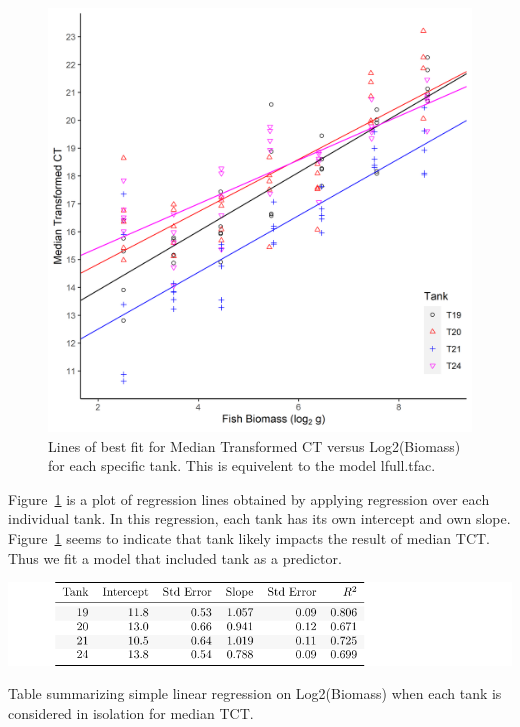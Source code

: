 \begin{figure}[H]
\includegraphics{Chapter3Images/ggplotnew2.png}
\caption{ Lines of best fit for Median Transformed CT versus Log2(Biomass) for each specific tank. This is equivelent to the model lfull.tfac.}
\label{fig:medct33}
\end{figure}

Figure~\ref{fig:medct33} is a plot of regression lines obtained by applying regression over each individual tank. In this regression, each tank has its own intercept and own slope. Figure~\ref{fig:medct33} seems to indicate that tank likely impacts the result of median TCT. Thus we fit a model that included tank as a predictor. 



\begin{table}[H]
\includegraphics{Chapter3Images/sumtable1.pdf}
\caption{Table summarizing simple linear regression on Log2(Biomass) when each tank is considered in isolation for median TCT.}
\label{fig:lmedspecific}
\end{table}



